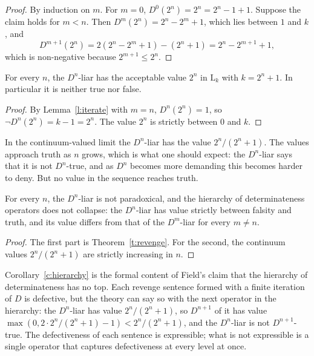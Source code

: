 \documentclass{situationist-preprint}
\begin{document}
\begin{proof}
By induction on $m$. For $m = 0$, $D^0(2^n) = 2^n = 2^n - 1 + 1$. Suppose the claim holds for $m < n$. Then $D^m(2^n) = 2^n - 2^m + 1$, which lies between $1$ and $k$, and
\[
D^{m+1}(2^n) = 2(2^n - 2^m + 1) - (2^n + 1) = 2^n - 2^{m+1} + 1,
\]
which is non-negative because $2^{m+1} \leq 2^n$.
\end{proof}

\begin{theorem}\label{t:revenge}
For every $n$, the $D^n$-liar has the acceptable value $2^n$ in $\mathrm{L}_k$ with $k = 2^n + 1$. In particular it is neither true nor false.
\end{theorem}

\begin{proof}
By Lemma~\ref{l:iterate} with $m = n$, $D^n(2^n) = 1$, so $\neg D^n(2^n) = k - 1 = 2^n$. The value $2^n$ is strictly between $0$ and $k$.
\end{proof}

In the continuum-valued limit the $D^n$-liar has the value $2^n/(2^n + 1)$. The values approach truth as $n$ grows, which is what one should expect: the $D^n$-liar says that it is not $D^n$-true, and as $D^n$ becomes more demanding this becomes harder to deny. But no value in the sequence reaches truth.

\begin{corollary}\label{c:hierarchy}
For every $n$, the $D^n$-liar is not paradoxical, and the hierarchy of determinateness operators does not collapse: the $D^n$-liar has value strictly between falsity and truth, and its value differs from that of the $D^m$-liar for every $m \neq n$.
\end{corollary}

\begin{proof}
The first part is Theorem~\ref{t:revenge}. For the second, the continuum values $2^n/(2^n+1)$ are strictly increasing in $n$.
\end{proof}

Corollary~\ref{c:hierarchy} is the formal content of Field's claim that the hierarchy of determinateness has no top. Each revenge sentence formed with a finite iteration of $D$ is defective, but the theory can say so with the next operator in the hierarchy: the $D^n$-liar has value $2^n/(2^n+1)$, so $D^{n+1}$ of it has value $\max(0, 2 \cdot 2^n/(2^n+1) - 1) < 2^n/(2^n+1)$, and the $D^n$-liar is not $D^{n+1}$-true. The defectiveness of each sentence is expressible; what is not expressible is a single operator that captures defectiveness at every level at once.
\end{document}
